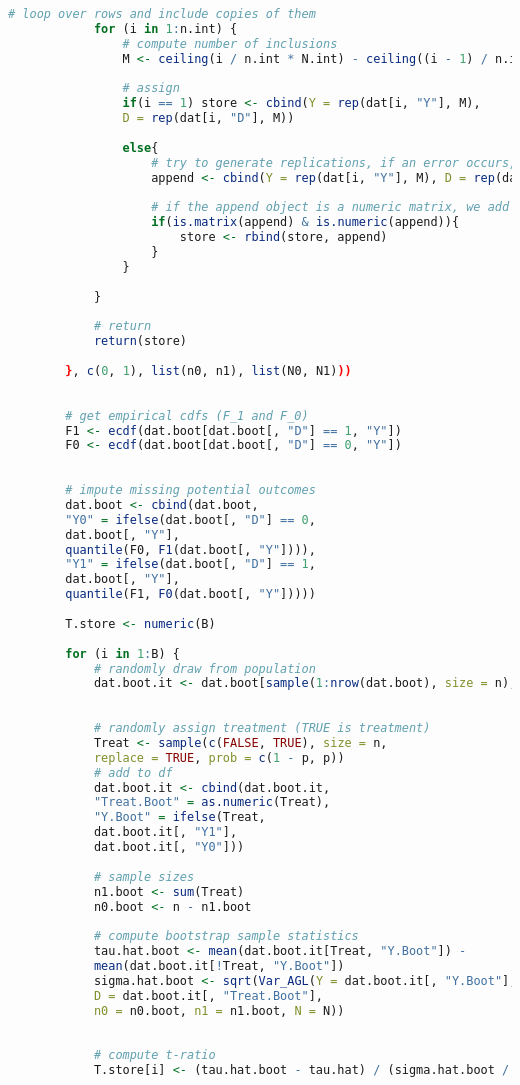 \documentclass[aodsor,preprint]{imsart}
\numberwithin{equation}{section}
\theoremstyle{plain}
\begin{document}
\begin{lstlisting}[language=R, basicstyle=\tiny\tiny]
			# loop over rows and include copies of them
			for (i in 1:n.int) {
				# compute number of inclusions
				M <- ceiling(i / n.int * N.int) - ceiling((i - 1) / n.int * N.int)
				
				# assign
				if(i == 1) store <- cbind(Y = rep(dat[i, "Y"], M),
				D = rep(dat[i, "D"], M))
				
				else{
					# try to generate replications, if an error occurs, we simply skip this one
					append <- cbind(Y = rep(dat[i, "Y"], M), D = rep(dat[i, "D"], M))
					
					# if the append object is a numeric matrix, we add it to the store object
					if(is.matrix(append) & is.numeric(append)){
						store <- rbind(store, append)
					} 
				}
				
			}
			
			# return
			return(store)
			
		}, c(0, 1), list(n0, n1), list(N0, N1)))
		
		
		# get empirical cdfs (F_1 and F_0)
		F1 <- ecdf(dat.boot[dat.boot[, "D"] == 1, "Y"])
		F0 <- ecdf(dat.boot[dat.boot[, "D"] == 0, "Y"])
		
		
		# impute missing potential outcomes
		dat.boot <- cbind(dat.boot,
		"Y0" = ifelse(dat.boot[, "D"] == 0,
		dat.boot[, "Y"],
		quantile(F0, F1(dat.boot[, "Y"]))), 
		"Y1" = ifelse(dat.boot[, "D"] == 1,
		dat.boot[, "Y"],
		quantile(F1, F0(dat.boot[, "Y"]))))
		
		T.store <- numeric(B)
		
		for (i in 1:B) {
			# randomly draw from population
			dat.boot.it <- dat.boot[sample(1:nrow(dat.boot), size = n), ]
			
			
			# randomly assign treatment (TRUE is treatment)
			Treat <- sample(c(FALSE, TRUE), size = n,
			replace = TRUE, prob = c(1 - p, p))
			# add to df
			dat.boot.it <- cbind(dat.boot.it,
			"Treat.Boot" = as.numeric(Treat),
			"Y.Boot" = ifelse(Treat,
			dat.boot.it[, "Y1"],
			dat.boot.it[, "Y0"]))
			
			# sample sizes
			n1.boot <- sum(Treat)
			n0.boot <- n - n1.boot
			
			# compute bootstrap sample statistics
			tau.hat.boot <- mean(dat.boot.it[Treat, "Y.Boot"]) - 
			mean(dat.boot.it[!Treat, "Y.Boot"])
			sigma.hat.boot <- sqrt(Var_AGL(Y = dat.boot.it[, "Y.Boot"],
			D = dat.boot.it[, "Treat.Boot"],
			n0 = n0.boot, n1 = n1.boot, N = N))
			
			
			# compute t-ratio
			T.store[i] <- (tau.hat.boot - tau.hat) / (sigma.hat.boot / sqrt(n))
			

\end{lstlisting}
\end{document}
